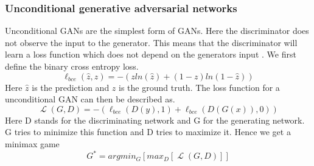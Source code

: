 \documentclass[a4paper,11pt]{article}
\DeclareMathOperator{\Lagr}{\mathcal{L}}
\begin{document}
\subsubsection{Unconditional generative adversarial networks}
Unconditional GANs are the simplest form of GANs. Here the discriminator does not observe the input to the generator. This means that the discriminator will learn a loss function which does not depend on the generators input \cite{isola_image--image_2016}. We first define the binary cross entropy loss.
\begin{equation}\label{eq:bce}
\ell_{bce}(\hat{z}, z)=-(zln(\hat{z})+(1-z)ln(1-\hat{z}))
\end{equation}
Here $\hat{z}$ is the prediction and $z$ is the ground truth.
The loss function for a unconditional GAN can then be described as.
 \begin{equation}
\Lagr(G, D) = -(\ell_{bce}(D(y), 1) + \ell_{bce}(D(G(x)), 0))
\end{equation}
Here D stands for the discriminating network and G for the generating network. G tries to minimize this function and D tries to maximize it. Hence we get a minimax game 
\begin{equation}
G^{*}=argmin_{G}[max_{D}[\Lagr(G, D)]]\label{eq:minimax}
\end{equation}
\end{document}
